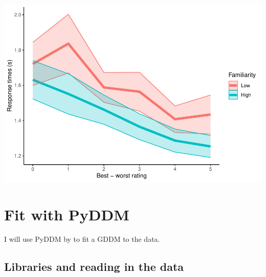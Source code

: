 \documentclass[
]{book}
\begin{document}
\includegraphics{LateNightBayes_files/figure-latex/unnamed-chunk-58-1.pdf}

\hypertarget{fit-with-pyddm}{%
\section{Fit with PyDDM}\label{fit-with-pyddm}}

I will use PyDDM by \citep{shinn2020} to fit a GDDM to the data.

\hypertarget{libraries-and-reading-in-the-data}{%
\subsection{Libraries and reading in the data}\label{libraries-and-reading-in-the-data}}
\end{document}
